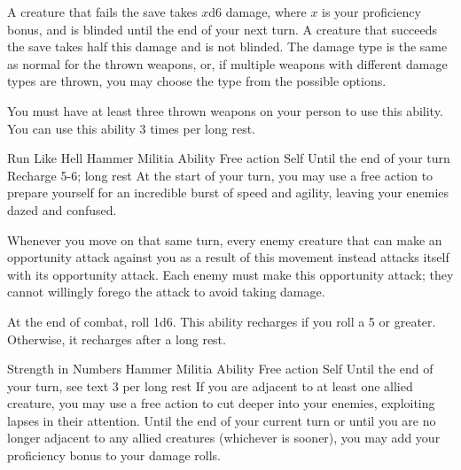 A creature that fails the save takes $x$d6 damage,
where $x$ is your proficiency bonus,
and is blinded until the end of your next turn.
A creature that succeeds the save takes half this damage
and is not blinded.
The damage type is the same as normal for the thrown weapons,
or, if multiple weapons with different damage types are thrown,
you may choose the type from the possible options.

You must have at least three thrown weapons on your person
to use this ability.
You can use this ability 3 times per long rest.


\ability%
    {Run Like Hell}
    {Hammer Militia Ability}
    {Free action}
    {Self}
    {Until the end of your turn}
    {Recharge 5-6; long rest}
At the start of your turn,
you may use a free action to prepare yourself
for an incredible burst of speed and agility,
leaving your enemies dazed and confused.

Whenever you move on that same turn,
every enemy creature that can make an opportunity attack
against you as a result of this movement
instead attacks itself with its opportunity attack.
Each enemy must make this opportunity attack;
they cannot willingly forego the attack to
avoid taking damage.

At the end of combat, roll 1d6.
This ability recharges if you roll a 5 or greater.
Otherwise, it recharges after a long rest.


\ability%
    {Strength in Numbers}
    {Hammer Militia Ability}
    {Free action}
    {Self}
    {Until the end of your turn, see text}
    {3 per long rest}
If you are adjacent to at least one allied creature,
you may use a free action to cut deeper into your enemies,
exploiting lapses in their attention.
Until the end of your current turn
or until you are no longer adjacent to any allied creatures
(whichever is sooner),
you may add your proficiency bonus to your damage rolls.


